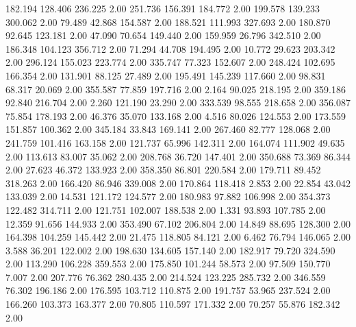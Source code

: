  182.194  128.406  236.225         2.00
 251.736  156.391  184.772         2.00
 199.578  139.233  300.062         2.00
  79.489   42.868  154.587         2.00
 188.521  111.993  327.693         2.00
 180.870   92.645  123.181         2.00
  47.090   70.654  149.440         2.00
 159.959   26.796  342.510         2.00
 186.348  104.123  356.712         2.00
  71.294   44.708  194.495         2.00
  10.772   29.623  203.342         2.00
 296.124  155.023  223.774         2.00
 335.747   77.323  152.607         2.00
 248.424  102.695  166.354         2.00
 131.901   88.125   27.489         2.00
 195.491  145.239  117.660         2.00
  98.831   68.317   20.069         2.00
 355.587   77.859  197.716         2.00
   2.164   90.025  218.195         2.00
 359.186   92.840  216.704         2.00
   2.260  121.190   23.290         2.00
 333.539   98.555  218.658         2.00
 356.087   75.854  178.193         2.00
  46.376   35.070  133.168         2.00
   4.516   80.026  124.553         2.00
 173.559  151.857  100.362         2.00
 345.184   33.843  169.141         2.00
 267.460   82.777  128.068         2.00
 241.759  101.416  163.158         2.00
 121.737   65.996  142.311         2.00
 164.074  111.902   49.635         2.00
 113.613   83.007   35.062         2.00
 208.768   36.720  147.401         2.00
 350.688   73.369   86.344         2.00
  27.623   46.372  133.923         2.00
 358.350   86.801  220.584         2.00
 179.711   89.452  318.263         2.00
 166.420   86.946  339.008         2.00
 170.864  118.418    2.853         2.00
  22.854   43.042  133.039         2.00
  14.531  121.172  124.577         2.00
 180.983   97.882  106.998         2.00
 354.373  122.482  314.711         2.00
 121.751  102.007  188.538         2.00
   1.331   93.893  107.785         2.00
  12.359   91.656  144.933         2.00
 353.490   67.102  206.804         2.00
  14.849   88.695  128.300         2.00
 164.398  104.259  145.442         2.00
  21.475  118.805   84.121         2.00
   6.462   76.794  146.065         2.00
   3.588   36.201  122.002         2.00
 198.630  134.605  157.140         2.00
 182.917   79.720  324.590         2.00
 113.290  106.228  359.553         2.00
 175.850  101.244   58.573         2.00
  97.509  150.770    7.007         2.00
 207.776   76.362  280.435         2.00
 214.524  123.225  285.732         2.00
 346.559   76.302  196.186         2.00
 176.595  103.712  110.875         2.00
 191.757   53.965  237.524         2.00
 166.260  103.373  163.377         2.00
  70.805  110.597  171.332         2.00
  70.257   55.876  182.342         2.00

